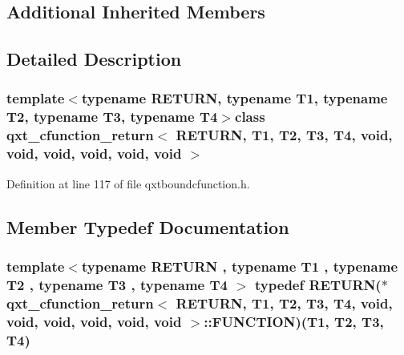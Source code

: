 \subsection*{Additional Inherited Members}


\subsection{Detailed Description}
\subsubsection*{template$<$typename R\-E\-T\-U\-R\-N, typename T1, typename T2, typename T3, typename T4$>$class qxt\-\_\-cfunction\-\_\-return$<$ R\-E\-T\-U\-R\-N, T1, T2, T3, T4, void, void, void, void, void, void $>$}



Definition at line 117 of file qxtboundcfunction.\-h.



\subsection{Member Typedef Documentation}
\hypertarget{classqxt__cfunction__return_3_01_r_e_t_u_r_n_00_01_t1_00_01_t2_00_01_t3_00_01_t4_00_01void_00_01cb1f9557addb597e90ffc938f21cd8d1_a88574753c1a7327ff86684c842d057ef}{
\subsubsection[{F\-U\-N\-C\-T\-I\-O\-N}]{\setlength{\rightskip}{0pt plus 5cm}template$<$typename R\-E\-T\-U\-R\-N , typename T1 , typename T2 , typename T3 , typename T4 $>$ typedef R\-E\-T\-U\-R\-N($\ast$ {\bf qxt\-\_\-cfunction\-\_\-return}$<$ R\-E\-T\-U\-R\-N, T1, T2, T3, T4, {\bf void}, {\bf void}, {\bf void}, {\bf void}, {\bf void}, {\bf void} $>$\-::F\-U\-N\-C\-T\-I\-O\-N)(T1, T2, T3, T4)}}\label{classqxt__cfunction__return_3_01_r_e_t_u_r_n_00_01_t1_00_01_t2_00_01_t3_00_01_t4_00_01void_00_01cb1f9557addb597e90ffc938f21cd8d1_a88574753c1a7327ff86684c842d057ef}


